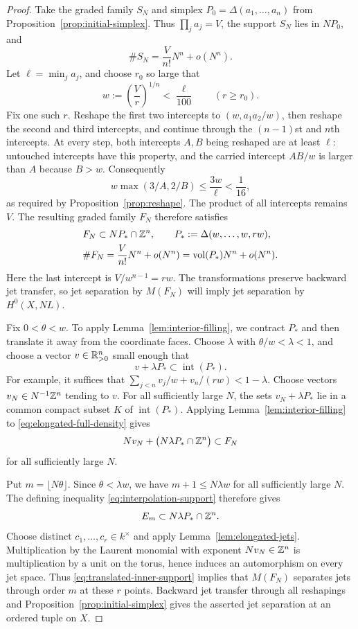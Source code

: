 \begin{proof}
Take the graded family $S_N$ and simplex
$P_0=\Delta(a_1,\ldots,a_n)$ from Proposition~\ref{prop:initial-simplex}.
Thus $\prod_j a_j=V$, the support $S_N$ lies in $NP_0$, and
\[
 \#S_N=\frac{V}{n!}N^n+o(N^n).
\]
Let $\ell=\min_j a_j$, and choose $r_0$ so large that
\[
 w:=\left(\frac Vr\right)^{1/n}<\frac{\ell}{100}
 \qquad(r\ge r_0).
\]
Fix one such $r$.  Reshape the first two intercepts to $(w,a_1a_2/w)$,
then reshape the second and third intercepts, and continue through the
$(n-1)$st and $n$th intercepts.  At every step, both intercepts $A,B$
being reshaped are at least $\ell$: untouched intercepts have this property,
and the carried intercept $AB/w$ is larger than $A$ because $B>w$.
Consequently
\[
 w\max(3/A,2/B)\le\frac{3w}{\ell}<\frac1{16},
\]
as required by Proposition~\ref{prop:reshape}.  The product of all intercepts
remains $V$.  The resulting graded family $F_N$ therefore satisfies
\begin{equation}\label{eq:elongated-full-density}
 \begin{aligned}
 &F_N\subset NP_*\cap\mathbb Z^n,
 \qquad P_*:=\Delta(w,\ldots,w,rw),\\
 &\#F_N=\frac{V}{n!}N^n+o(N^n)
        =\operatorname{vol}(P_*)N^n+o(N^n).
 \end{aligned}
\end{equation}
Here the last intercept is $V/w^{n-1}=rw$.
The transformations preserve backward jet transfer, so jet separation by
$M(F_N)$ will imply jet separation by $H^0(X,NL)$.

Fix $0<\theta<w$.  To apply Lemma~\ref{lem:interior-filling}, we contract
$P_*$ and then translate it away from the coordinate faces.
Choose $\lambda$ with $\theta/w<\lambda<1$, and choose a vector
$v\in\mathbb R_{>0}^n$ small enough that
\[
 v+\lambda P_*\subset\operatorname{int}(P_*).
\]
For example, it suffices that
$\sum_{j<n}v_j/w+v_n/(rw)<1-\lambda$.
Choose vectors $v_N\in N^{-1}\mathbb Z^n$ tending to $v$.
For all sufficiently large $N$, the sets $v_N+\lambda P_*$ lie in a common
compact subset $K$ of $\operatorname{int}(P_*)$.  Applying
Lemma~\ref{lem:interior-filling} to \eqref{eq:elongated-full-density} gives
\begin{equation}\label{eq:translated-inner-support}
 Nv_N+\bigl(N\lambda P_*\cap\mathbb Z^n\bigr)\subset F_N
\end{equation}
for all sufficiently large $N$.

Put $m=\lfloor N\theta\rfloor$.  Since $\theta<\lambda w$, we have
$m+1\le N\lambda w$ for all sufficiently large $N$.
The defining inequality \eqref{eq:interpolation-support} therefore gives
\[
 E_m\subset N\lambda P_*\cap\mathbb Z^n.
\]
Choose distinct $c_1,\ldots,c_r\in k^\times$ and apply
Lemma~\ref{lem:elongated-jets}.  Multiplication by the Laurent monomial with
exponent $Nv_N\in\mathbb Z^n$ is multiplication by a unit on the torus, hence
induces an automorphism on every jet space.  Thus
\eqref{eq:translated-inner-support} implies that $M(F_N)$ separates jets
through order $m$ at these $r$ points.  Backward jet transfer through all
reshapings and Proposition~\ref{prop:initial-simplex} gives the asserted
jet separation at an ordered tuple on $X$.


\end{proof}
